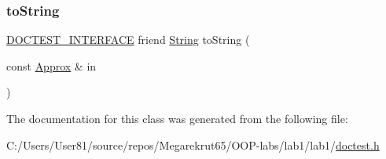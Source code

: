 \mbox{\label{classdoctest_1_1_approx_aa1ba324952b7844d35fc569b1c6c139a}} 
\subsubsection{\texorpdfstring{to\+String}{toString}}
{\footnotesize\ttfamily \mbox{\hyperlink{doctest_8h_a9c16ffc635ec47f07797d21ede26b1a5}{D\+O\+C\+T\+E\+S\+T\+\_\+\+I\+N\+T\+E\+R\+F\+A\+CE}} friend \mbox{\hyperlink{classdoctest_1_1_string}{String}} to\+String (\begin{DoxyParamCaption}\item[{const \mbox{\hyperlink{classdoctest_1_1_approx}{Approx}} \&}]{in }\end{DoxyParamCaption})\hspace{0.3cm}{\ttfamily [friend]}}



The documentation for this class was generated from the following file\+:\begin{DoxyCompactItemize}
\item 
C\+:/\+Users/\+User81/source/repos/\+Megarekrut65/\+O\+O\+P-\/labs/lab1/lab1/\mbox{\hyperlink{doctest_8h}{doctest.\+h}}\end{DoxyCompactItemize}
